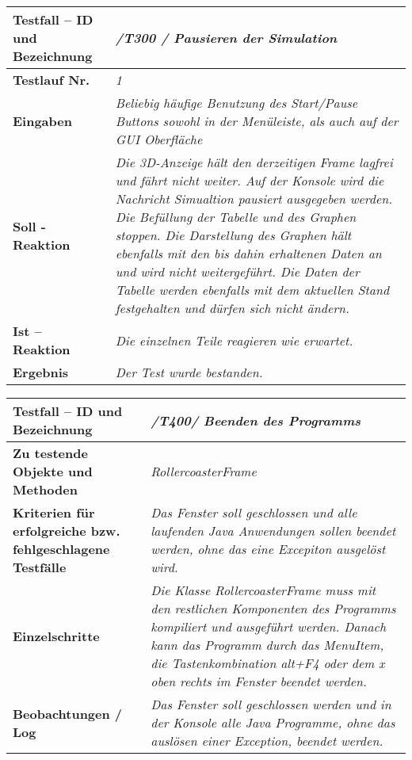 \begin{longtable}{|p{7cm}|p{10cm}|}
\hline
\textbf{Testfall -- ID und Bezeichnung} & \textit{ /T300 / Pausieren der Simulation} \\
\hline
\textbf{Testlauf Nr.} & \textit{1} \\
\hline
\textbf{Eingaben} & \textit{Beliebig häufige Benutzung des Start/Pause Buttons sowohl in der Menüleiste, als auch auf der GUI Oberfläche} \\
\hline
\textbf{Soll - Reaktion} & \textit{Die 3D-Anzeige hält den derzeitigen Frame lagfrei und fährt nicht weiter. Auf der Konsole wird die Nachricht Simualtion pausiert ausgegeben werden. 
Die Befüllung der Tabelle und des Graphen stoppen. Die Darstellung des Graphen hält ebenfalls mit den bis dahin erhaltenen Daten an und wird nicht weitergeführt. Die Daten der Tabelle werden 
ebenfalls mit dem aktuellen Stand festgehalten und dürfen sich nicht ändern.} \\
\hline
\textbf{Ist -- Reaktion} & \textit{Die einzelnen Teile reagieren wie erwartet.} \\
\hline
\textbf{Ergebnis} & \textit{Der Test wurde bestanden.} \\
\hline
\end{longtable}

\begin{longtable}{|p{7cm}|p{10cm}|}
\hline
\textbf{Testfall -- ID und Bezeichnung} &  \textit{/T400/ Beenden des Programms} \\
\hline
\textbf{Zu testende Objekte und Methoden} &  \textit{RollercoasterFrame}
\\
\hline
\textbf{Kriterien für erfolgreiche bzw. fehlgeschlagene Testfälle} &
\textit{Das Fenster soll geschlossen und alle laufenden Java Anwendungen sollen beendet werden, ohne das eine Excepiton ausgelöst wird.} \\
\hline
\textbf{Einzelschritte} &  \textit{Die Klasse RollercoasterFrame muss mit den restlichen Komponenten des Programms kompiliert und ausgeführt werden. Danach kann das Programm durch das MenuItem,
die Tastenkombination alt+F4 oder dem x oben rechts im Fenster beendet werden.} \\
\hline
\textbf{Beobachtungen / Log} &  \textit{Das Fenster soll geschlossen werden und in der Konsole alle Java Programme, ohne das auslösen einer Exception, beendet werden.} \\
\hline
\end{longtable}

